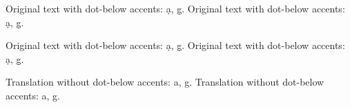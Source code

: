 \documentclass{article}
\begin{document}
\let\ledstrutL\relax
\let\ledstrutR\relax

\blindtext Original text with dot-below accents: \d{a}, \d{g}. \blindtext Original text with dot-below accents: \d{a}, \d{g}. \blindtext

\begin{pages}
\begin{Leftside}
\beginnumbering
\pstart \blindtext Original text with dot-below accents: \d{a}, \d{g}. \blindtext Original text with dot-below accents: \d{a}, \d{g}. \blindtext
\pend
\endnumbering
\end{Leftside}
\begin{Rightside}
\beginnumbering
\pstart  \blindtext Translation without dot-below accents: a, g. \blindtext Translation without dot-below accents: a, g. \blindtext
\pend
\endnumbering
\end{Rightside}
\end{pages}
\Pages
\end{document}
